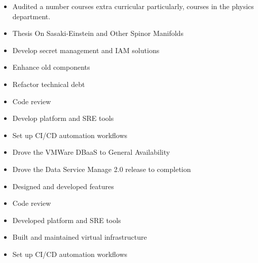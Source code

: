 \documentclass[10pt,a4paper,ragged2e,withhyper]{altacv}
\begin{document}


\makecvheader
\bigskip
\bigskip


\begin{itemize}
\item Audited a number courses extra curricular particularly, courses in the physics department.
\end{itemize}
\divider

\begin{itemize}
\item Thesis On Sasaki-Einstein and Other Spinor Manifolds
\end{itemize}
\bigskip
\bigskip


\begin{itemize}
\item Develop secret management and IAM solutions
\item Enhance old components
\item Refactor technical debt
\item Code review
\item Develop platform and SRE tools
\item Set up CI/CD automation workflows
\end{itemize}
\divider

\begin{itemize}
\item Drove the VMWare DBaaS to General Availability
\item Drove the Data Service Manage 2.0 release to completion
\item Designed and developed features
\item Code review
\item Developed platform and SRE tools
\item Built and maintained virtual infrastructure
\item Set up CI/CD automation workflows
\end{itemize}
\end{document}
